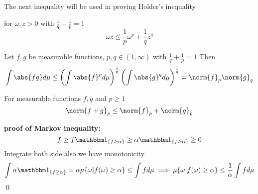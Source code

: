 The next inequality will be used in proving Holder's inequality
\begin{thm} for $\omega, z > 0$ with $\frac{1}{q}+\frac{1}{p} = 1$
\begin{equation*}
    \omega z \leq \frac{1}{p} \omega^p + \frac{1}{q} z^q
\end{equation*}
\end{thm}
\begin{thm}\label{holder} Let $f, g$ be measurable functions, $p,q \in (1, \infty)$ with $\frac{1}{q}+\frac{1}{p} = 1$ Then
\begin{equation*}
    \int \abs{fg} d\mu \leq \left(\int \abs{f}^p  d\mu\right)^{\frac{1}{p}}\left(\int \abs{g}^q  d\mu\right)^{\frac{1}{q}} = \norm{f}_p \norm{g}_q
\end{equation*}
\end{thm}
\begin{thm}For measurable functions $f,g$ and $p\geq 1$
\begin{equation*}
    \norm{f+g}_p \leq \norm{f}_p +\norm{g}_p
\end{equation*}
\end{thm}

\newpage
\textbf{proof of Markov inequality:} \\
\pf \begin{equation*}
    f\geq f \I_{\{f\geq \alpha\}} \geq \alpha\I_{\{f\geq \alpha\}} \geq 0
\end{equation*}Integrate both side also we have monotonicity
\begin{equation*}
    \int \alpha\I_{\{f\geq \alpha\}} = \alpha\mu\{\omega| f(\omega) \geq \alpha\} \leq \int fd\mu \implies \mu\{\omega| f(\omega) \geq \alpha\} \leq \frac{1}{\alpha}\int fd\mu
\end{equation*}\qed

